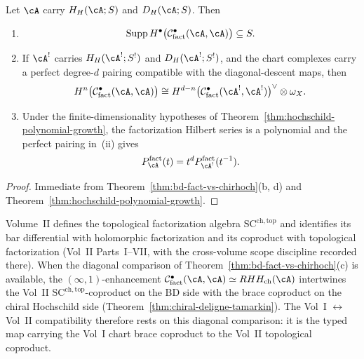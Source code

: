 \begin{corollary}
\label{cor:thm-H-bd-extension}
Let $\cA$ carry $H_H(\cA;S)$ and $D_H(\cA;S)$.  Then
\begin{enumerate}[label=\textup{(\roman*)}]
\item
\[
 \operatorname{Supp}
 H^\bullet\bigl(\mathcal C^\bullet_{\mathrm{fact}}(\cA,\cA)\bigr)
 \subseteq S.
\]
\item If $\cA^!$ carries $H_H(\cA^!;S^!)$ and
$D_H(\cA^!;S^!)$, and the chart complexes carry a perfect degree-$d$
pairing compatible with the diagonal-descent maps, then
\[
 H^n\bigl(\mathcal C^\bullet_{\mathrm{fact}}(\cA,\cA)\bigr)
 \cong
 H^{d-n}\bigl(\mathcal C^\bullet_{\mathrm{fact}}(\cA^!,\cA^!)\bigr)^\vee
 \otimes\omega_X.
\]
\item Under the finite-dimensionality hypotheses of
Theorem~\ref{thm:hochschild-polynomial-growth}, the factorization
Hilbert series is a polynomial and the perfect pairing in~\textup{(ii)}
gives
\[
 P^{\mathrm{fact}}_{\cA}(t)
 =t^dP^{\mathrm{fact}}_{\cA^!}(t^{-1}).
\]
\end{enumerate}
\end{corollary}

\begin{proof}
Immediate from
Theorem~\textup{\ref{thm:bd-fact-vs-chirhoch}}\textup{(b, d)}
and Theorem~\textup{\ref{thm:hochschild-polynomial-growth}}.
\end{proof}

\begin{remark}
\label{rem:vol2-topological-factorization-comparison}
Volume~II defines the topological factorization algebra
$\mathrm{SC}^{\mathrm{ch,top}}$ and identifies its bar differential
with holomorphic factorization and its coproduct with topological
factorization (Vol~II Parts~I--VII, with the cross-volume scope
discipline recorded there). When the diagonal comparison of
Theorem~\textup{\ref{thm:bd-fact-vs-chirhoch}}(c) is available, the
$(\infty,1)$-enhancement $\mathcal{C}^\bullet_{\mathrm{fact}}(\cA,\cA)\simeq
RHH_{\mathrm{ch}}(\cA)$ intertwines the Vol~II
$\mathrm{SC}^{\mathrm{ch,top}}$-coproduct on the BD side with the
brace coproduct on the chiral Hochschild side
\textup{(}Theorem~\textup{\ref{thm:chiral-deligne-tamarkin}}\textup{)}.
The Vol~I $\leftrightarrow$ Vol~II compatibility therefore rests on
this diagonal comparison: it is the typed map carrying the Vol~I
chart brace coproduct to the Vol~II topological coproduct.
\end{remark}

